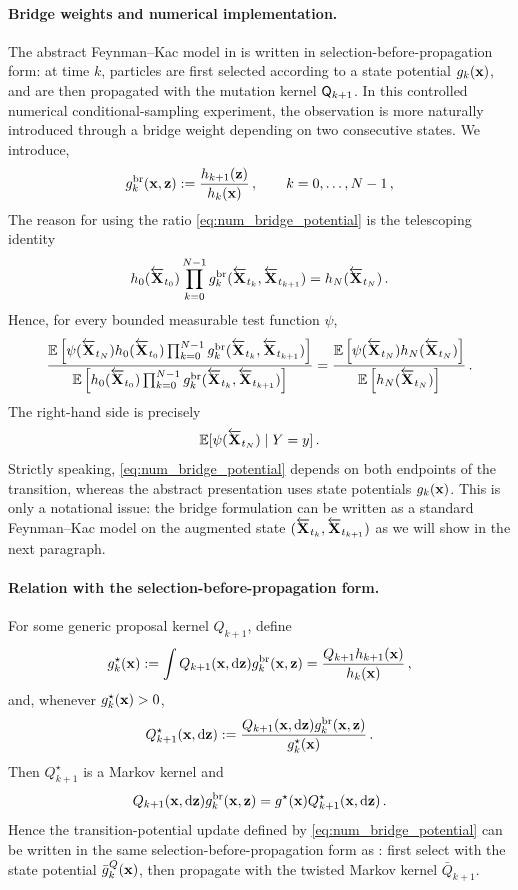 \documentclass[11pt]{article}
\theoremstyle{plain}
\theoremstyle{definition}
\theoremstyle{remark}
\begin{document}
\paragraph{Bridge weights and numerical implementation.}
The abstract Feynman--Kac model in  is written in selection-before-propagation form: at time $k$, particles are first selected according to a state potential $\pot{k}(\x)$, and are then propagated with the
mutation kernel $\mk{k+1}$. In this controlled numerical conditional-sampling experiment, the observation is more naturally introduced through a bridge weight depending on two consecutive states. We introduce,
\begin{equation} \label{eq:num_bridge_potential}
\pot{k}^{\rm br}(\x,\z) \eqdef \frac{h_{k+1}(\z)}{h_k(\x)} \eqsp,  \qquad k=0,\ldots,N-1 \eqsp,
\end{equation}
%
The reason for using the ratio \eqref{eq:num_bridge_potential} is the telescoping identity
$$
h_0(\Xola_{t_0}) \prod_{k=0}^{N-1} \pot{k}^{\rm br}(\Xola_{t_k},\Xola_{t_{k+1}}) = h_N(\Xola_{t_N}) \eqsp.
$$
Hence, for every bounded measurable test function $\psi$,
$$
\frac{ \E\left[ \psi(\Xola_{t_N}) h_0(\Xola_{t_0}) \prod_{k=0}^{N-1} \pot{k}^{\rm br}(\Xola_{t_k},\Xola_{t_{k+1}}) \right] }{ \E\left[ h_0(\Xola_{t_0}) \prod_{k=0}^{N-1} \pot{k}^{\rm br}(\Xola_{t_k},\Xola_{t_{k+1}}) \right]}
= \frac{ \E\left[ \psi(\Xola_{t_N})h_N(\Xola_{t_N}) \right] }{ \E\left[ h_N(\Xola_{t_N}) \right] } \eqsp.
$$
The right-hand side is precisely
$$
\mathbb{E}[\psi(\overleftarrow{\mathbf{X}}_{t_N})\mid Y=y] \,.
$$
%
Strictly speaking, \eqref{eq:num_bridge_potential} depends on both endpoints of the transition, whereas the abstract presentation uses state potentials $\pot{k}(\x)$. This is only a notational issue: the bridge formulation can be written as a standard Feynman--Kac model on the augmented state $(\overleftarrow{\mathbf{X}}_{t_k},\overleftarrow{\mathbf{X}}_{t_{k+1}})$ as we will show in the next paragraph.
%
%
\paragraph{Relation with the selection-before-propagation form.}
For some generic proposal kernel $Q_{k+1}$, define
$$
g_k^{\star}(\x) \eqdef \int Q_{k+1}(\x,\rmd \z) \pot{k}^{\rm br}(\x,\z)
= \frac{  Q_{k+1}h_{k+1}(\x) }{ h_k(\x) } \eqsp,
$$
and, whenever $g_k^\star(\mathbf{x})>0$,
$$
Q_{k+1}^\star(\x,\rmd \z) \eqdef \frac{ Q_{k+1}(\x,\rmd \z) \pot{k}^{\rm br}(\x,\z)}{ g_k^\star(\x)} \eqsp.
$$
Then $Q^\star_{k+1}$ is a Markov kernel and
$$
Q_{k+1}(\x,\rmd \z) \pot{k}^{\rm br}(\x,\z)
= g^{\star}(\x)Q_{k+1}^\star(\x,\rmd \z) \eqsp.
$$
Hence the transition-potential update defined by \eqref{eq:num_bridge_potential} can be written in the same selection-before-propagation form as : first select with the state potential $\bar g_k^Q(\mathbf{x})$, then propagate with the twisted Markov kernel $\bar Q_{k+1}$.
\end{document}
